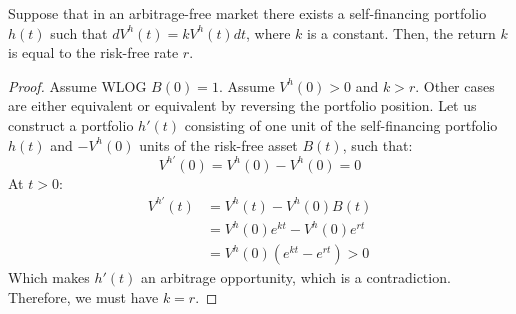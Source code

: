 \begin{lemma}
    \label{lem:risk_free}
    Suppose that in an arbitrage-free market there exists a self-financing portfolio $h(t)$ such that $dV^h(t) = k V^h(t) dt$, where $k$ is a constant. Then, the return $k$ is equal to the risk-free rate $r$.
\end{lemma}
\begin{proof}
    Assume WLOG $B(0) = 1$. Assume $V^h(0) > 0$ and $k>r$. Other cases are either equivalent or equivalent by reversing the portfolio position.
    Let us construct a portfolio $h'(t)$ consisting of one unit of the self-financing portfolio $h(t)$ and $-V^h(0)$ units of the risk-free asset $B(t)$, such that:
    \begin{equation}
        V^{h'}(0) = V^h(0)-V^h(0) = 0
    \end{equation}
    At $t>0$:
    \begin{equation}
        \begin{aligned}
            V^{h'}(t) &= V^h(t) - V^h(0)B(t)\\
            &= V^h(0)e^{kt} - V^h(0)e^{rt}\\
            &= V^h(0)(e^{kt} - e^{rt}) > 0
        \end{aligned}
    \end{equation}
    Which makes $h'(t)$ an arbitrage opportunity, which is a contradiction. Therefore, we must have $k = r$.
\end{proof}

